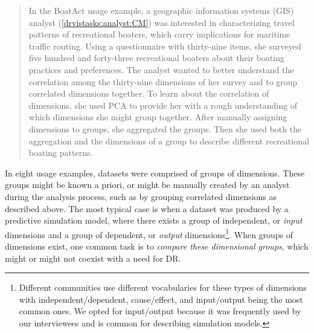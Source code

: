 \begin{quotation}
    \begin{sloppypar}
    In the {\sc BoatAct} usage example, a geographic information systems (GIS) analyst (\ref{drvistasks:analyst:CM}) was interested in characterizing travel patterns of recreational boaters, which carry implications for maritime traffic routing.
    Using a questionnaire with thirty-nine items, she surveyed five hundred and forty-three recreational boaters about their boating practices and preferences. 
    The analyst wanted to better understand the correlation among the thirty-nine dimensions of her survey and to group correlated dimensions together. To learn about the correlation of dimensions, she used \ac{PCA} to provide her with a rough understanding of which dimensions she might group together.
    After manually assigning dimensions to groups, she aggregated the groups. 
    Then she used both the aggregation and the dimensions of a group to describe different recreational boating patterns.
    \end{sloppypar}
\end{quotation}

In eight usage examples, datasets were comprised of groups of dimensions. 
These groups might be known a priori, or might be manually created by an analyst during the analysis process, such as by grouping correlated dimensions as described above. 
The most typical case is when a dataset was produced by a predictive simulation model, where there exists a group of independent, or {\it input} dimensions and a group of dependent, or {\it output} dimensions\footnote{Different communities use different vocabularies for these types of dimensions with independent/dependent, cause/effect, and input/output being the most common ones. 
We opted for input/output because it was frequently used by our interviewees and is common for describing simulation models.}.
When groups of dimensions exist, one common task is to {\it compare these dimensional groups}, which might or might not coexist with a need for \ac{DR}. 

